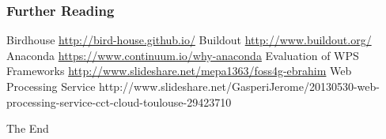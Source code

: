 \documentclass{beamer}
\begin{document}
   \begin{frame}[allowframebreaks]
    \frametitle<presentation>{Further Reading}    
    \begin{thebibliography}{10}    
      \beamertemplatearticlebibitems
      Birdhouse
      \newblock \url{http://bird-house.github.io/}
      Buildout
      \newblock \url{http://www.buildout.org/}
      Anaconda
      \newblock \url{https://www.continuum.io/why-anaconda}
      Evaluation of WPS Frameworks
      \newblock \url{http://www.slideshare.net/mepa1363/foss4g-ebrahim}
      Web Processing Service
      \newblock http://www.slideshare.net/GasperiJerome/20130530-web-processing-service-cct-cloud-toulouse-29423710
   
    \end{thebibliography}
    
  \end{frame}
  

  \begin{frame}
    \Huge{\centerline{The End}}
  \end{frame}

\end{document}
